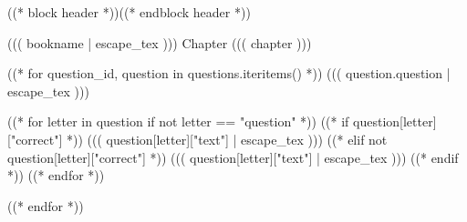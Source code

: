 \documentclass[]{exam}
\begin{document}
((* block header *))((* endblock header *))

\begin{center}
    ((( bookname | escape_tex )))
    Chapter ((( chapter )))
\end{center}

\begin{questions}

((* for question_id, question in questions.iteritems() *))
\question
((( question.question | escape_tex )))
\begin{choices}
    ((* for letter in question if not letter == "question" *))
    ((* if question[letter]["correct"] *))
    \CorrectChoice ((( question[letter]["text"] | escape_tex )))
    ((* elif not question[letter]["correct"] *))
    \choice ((( question[letter]["text"] | escape_tex )))
    ((* endif *))
    ((* endfor *))
\end{choices}
((* endfor *))
\end{questions}
\end{document}
